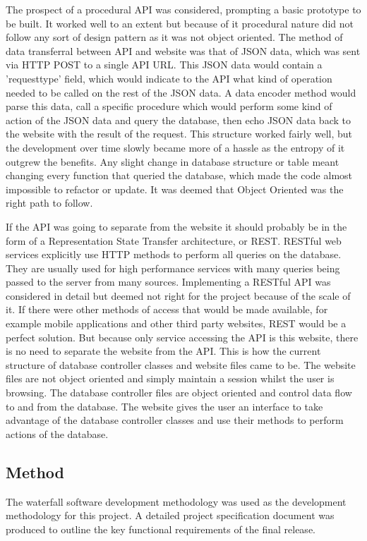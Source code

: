 		The prospect of a procedural API was considered, prompting a basic prototype to be built. It worked well to an extent but because of it procedural nature did not follow any sort of design pattern as it was not object oriented. The method of data transferral between API and website was that of JSON data, which was sent via HTTP POST to a single API URL. This JSON data would contain a 'request\textunderscore type' field, which would indicate to the API what kind of operation needed to be called on the rest of the JSON data. A data encoder method would parse this data, call a specific procedure which would perform some kind of action of the JSON data and query the database, then echo JSON data back to the website with the result of the request. This structure worked fairly well, but the development over time slowly became more of a hassle as the entropy of it outgrew the benefits. Any slight change in database structure or table meant changing every function that queried the database, which made the code almost impossible to refactor or update. It was deemed that Object Oriented was the right path to follow. 
		
		If the API was going to separate from the website it should probably be in the form of a Representation State Transfer architecture, or REST. RESTful web services explicitly use HTTP methods to perform all queries on the database. They are usually used for high performance services with many queries being passed to the server from many sources. Implementing a RESTful API was considered in detail but deemed not right for the project because of the scale of it. If there were other methods of access that would be made available, for example mobile applications and other third party websites, REST would be a perfect solution. But because only service accessing the API is this website, there is no need to separate the website from the API. This is how the current structure of database controller classes and website files came to be. The website files are not object oriented and simply maintain a session whilst the user is browsing. The database controller files are object oriented and control data flow to and from the database. The website gives the user an interface to take advantage of the database controller classes and use their methods to perform actions of the database.
		
	\subsection{Method}
		The waterfall software development methodology was used as the development methodology for this project. A detailed project specification document was produced to outline the key functional requirements of the final release. 
		
